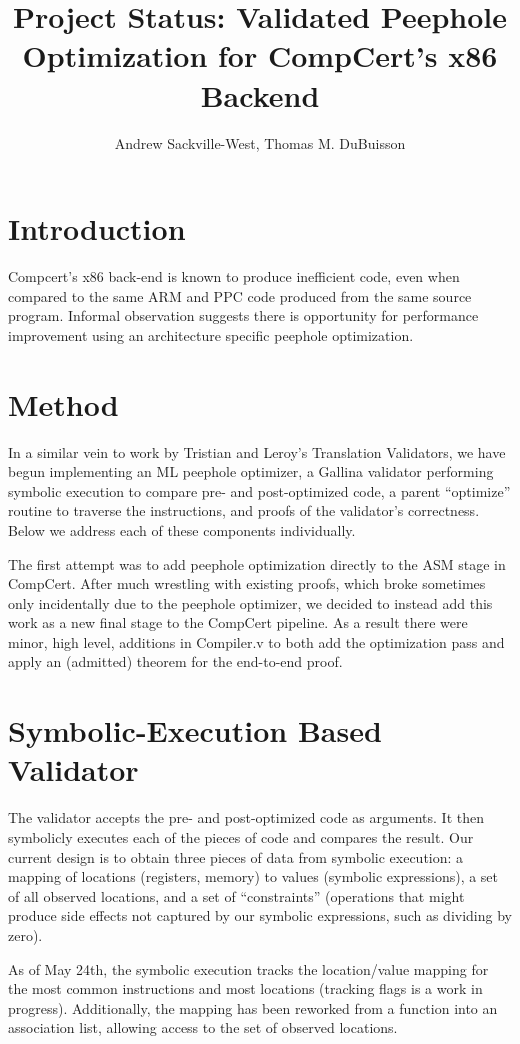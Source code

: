 \documentclass{article}
\title{Project Status: Validated Peephole Optimization for CompCert's x86 Backend}
\author{Andrew Sackville-West, Thomas M. DuBuisson}
\begin{document}
\maketitle

\section{Introduction}

Compcert's x86 back-end is known to produce inefficient code, even
when compared to the same ARM and PPC code produced from the same
source program.  Informal observation suggests there is opportunity
for performance improvement using an architecture specific peephole
optimization.

\section{Method}
In a similar vein to work by Tristian and Leroy's Translation
Validators, we have begun implementing an ML peephole optimizer, a
Gallina validator performing symbolic execution to compare pre- and
post-optimized code, a parent ``optimize'' routine to traverse the
instructions, and proofs of the validator's correctness.  Below we
address each of these components individually.

The first attempt was to add peephole optimization directly to the ASM
stage in CompCert.  After much wrestling with existing proofs, which
broke sometimes only incidentally due to the peephole optimizer, we
decided to instead add this work as a new final stage to the CompCert
pipeline.  As a result there were minor, high level, additions in
Compiler.v to both add the optimization pass and apply an (admitted)
theorem for the end-to-end proof.

\section{Symbolic-Execution Based Validator}
The validator accepts the pre- and post-optimized code as arguments.
It then symbolicly executes each of the pieces of code and compares
the result.  Our current design is to obtain three pieces of data from
symbolic execution: a mapping of locations (registers, memory) to
values (symbolic expressions), a set of all observed locations, and a
set of ``constraints'' (operations that might produce side effects not
captured by our symbolic expressions, such as dividing by zero).

As of May 24th, the symbolic execution tracks the location/value
mapping for the most common instructions and most locations (tracking
flags is a work in progress).  Additionally, the mapping has been
reworked from a function into an association list, allowing access to
the set of observed locations.
\end{document}

